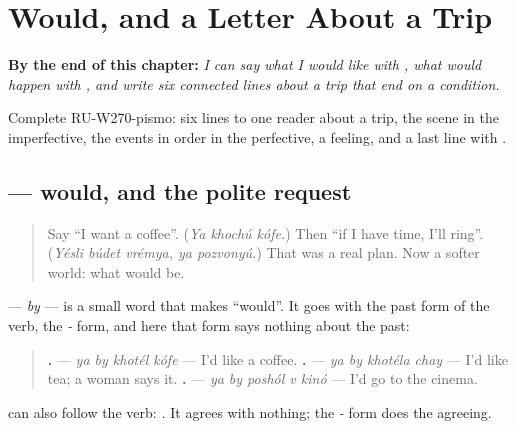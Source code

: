 
\chapter{Would, and a Letter About a Trip}
\label{ch:ru-would-and-a-letter-about-a-trip}

\begin{chapteropening}
\textbf{By the end of this chapter:} \emph{I can say what I would like with   , what would happen with  , and write six connected lines about a trip that end on a condition.}

Complete RU-W270-pismo: six lines to one reader about a trip, the scene in the imperfective, the events in order in the perfective, a feeling, and a last line with .
\end{chapteropening}

\section[\texorpdfstring{\ru{я} \ru{бы} \ru{хотел}, \ru{я} \ru{бы} … (ya by khotél, ya …)}{я бы хотел, я бы … (ya by khotél, ya …)}]{   — would, and the polite request}

\label{lesson:RU-C270-ya-by-khotel}



\begin{quote}
Say \textquotedblleft{}I want a coffee\textquotedblright{}. (\emph{Ya khochú kófe.}) Then \textquotedblleft{}if I have time, I'll ring\textquotedblright{}. (\emph{Yésli búdet vrémya, ya pozvonyú.}) That was a real plan. Now a softer world: what would be.
\end{quote}

\begin{grammarlens}[title={Grammar Lens: \ru{бы} and the -\ru{л} form}]
\textbf{} — \emph{by} — is a small word that makes \textquotedblleft{}would\textquotedblright{}. It goes with the past form of the verb, the \emph{-} form, and here that form says nothing about the past:

\begin{quote}
\textbf{   .} — \emph{ya by khotél kófe} — I'd like a coffee. \textbf{   .} — \emph{ya by khotéla chay} — I'd like tea; a woman says it. \textbf{    .} — \emph{ya by poshól v kinó} — I'd go to the cinema.
\end{quote}

\textbf{} can also follow the verb: \emph{   .} It agrees with nothing; the \emph{-} form does the agreeing.
\end{grammarlens}

